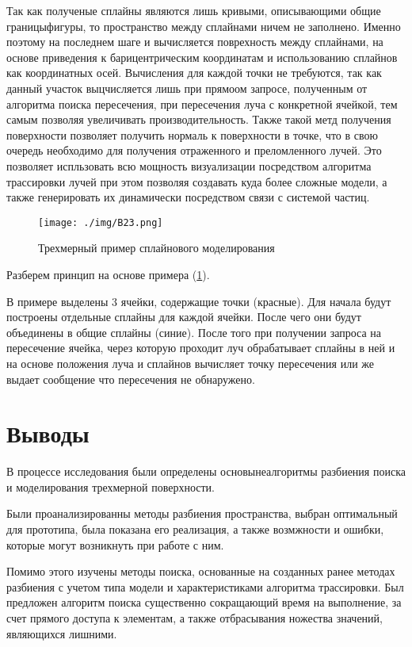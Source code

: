 Так как полученые сплайны являются лишь кривыми, описывающими общие границыфигуры, то пространство между сплайнами ничем не заполнено. Именно поэтому на последнем шаге и вычисляется поврехность между сплайнами, на основе приведения к барицентрическим координатам и использованию сплайнов как координатных осей. Вычисления для каждой точки не требуются, так как данный участок выцчисляется лишь при прямоом запросе, полученным от алгоритма поиска пересечения, при пересечения луча с конкретной ячейкой, тем самым позволяя увеличивать производительность. Также такой метд получения поверхности позволяет получить нормаль к поверхности в точке, что в свою очередь необходимо для получения отраженного и преломленного лучей. Это позволяет испльзовать всю мощность визуализации посредством алгоритма трассировки лучей при этом позволяя создавать куда более сложные модели, а также генерировать их динамически посредством связи с системой частиц. 


\begin{figure} 
\begin{center}
\texttt{[image: ./img/B23.png]}
\end{center}
\caption{Трехмерный пример сплайнового моделирования}
\label{pic:B23}
\end{figure}

Разберем принцип на основе примера (\ref{pic:B23}).

В примере выделены 3 ячейки, содержащие точки (красные). Для начала будут построены отдельные сплайны для каждой ячейки. После чего они будут объединены в общие сплайны (синие). После того при получении запроса на пересечение ячейка, через которую проходит луч обрабатывает сплайны в ней и на основе положения луча и сплайнов вычисляет точку пересечения или же выдает сообщение что пересечения не обнаружено.
\section{Выводы}

В процессе исследования были определены основынеалгоритмы разбиения поиска и моделирования трехмерной поверхности.

Были проанализированны методы разбиения пространства, выбран оптимальный для прототипа, была показана его реализация, а также возмжности и ошибки, которые могут возникнуть при работе с ним.

Помимо этого изучены методы поиска, основанные на созданных ранее методах разбиения с учетом типа модели и характеристиками алгоритма трассировки. Был предложен алгоритм поиска существенно сокращающий время на выполнение, за счет прямого доступа к элементам, а также отбрасывания ножества значений, являющихся лишними.

